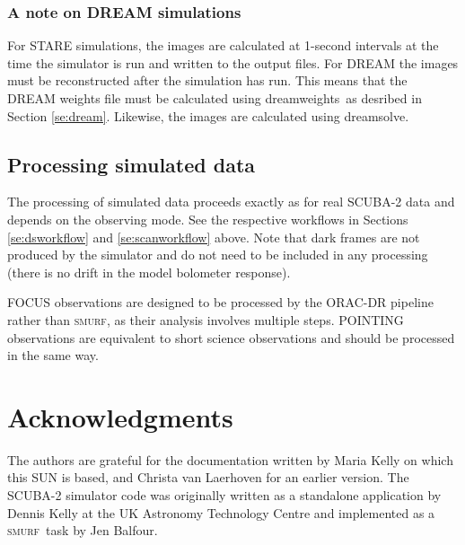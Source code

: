 \documentclass[twoside,11pt]{article}
\newcommand{\xref}[3]{#1}
\newcommand{\xlabel}[1]{}
\renewcommand{\_}{\texttt{\symbol{95}}}
\newcommand{\SMURF}{\textsc{smurf}}
\newcommand{\task}[1]{\textsf{#1}}
\newcommand{\dreamsolve}{\xref{\task{dreamsolve}}{sun258}{DREAMSOLVE}}
\newcommand{\dreamweights}{\xref{\task{dreamweights}}{sun258}{DREAMWEIGHTS}}
\begin{document}
\subsubsection{\xlabel{dreamsim}A note on DREAM simulations\label{se:dreamsim}}

For STARE simulations, the images are calculated at 1-second intervals
at the time the simulator is run and written to the output files. For
DREAM the images must be reconstructed after the simulation has
run. This means that the DREAM weights file must be calculated using
\dreamweights\ as desribed in Section \ref{se:dream}. Likewise, the
images are calculated using \dreamsolve.

\subsection{\xlabel{simdr}Processing simulated data\label{se:simdr}}

The processing of simulated data proceeds exactly as for real SCUBA-2
data and depends on the observing mode. See the respective workflows
in Sections \ref{se:dsworkflow} and \ref{se:scanworkflow} above. Note
that dark frames are not produced by the simulator and do not need to
be included in any processing (there is no drift in the model
bolometer response).

FOCUS observations are designed to be processed by the ORAC-DR
pipeline rather than \SMURF, as their analysis involves multiple
steps. POINTING observations are equivalent to short science
observations and should be processed in the same way.

\section{Acknowledgments}

The authors are grateful for the documentation written by Maria Kelly
on which this SUN is based, and Christa van Laerhoven for an earlier
version. The SCUBA-2 simulator code was originally written as a
standalone application by Dennis Kelly at the UK Astronomy Technology
Centre and implemented as a \SMURF\ task by Jen Balfour.

\end{document}

